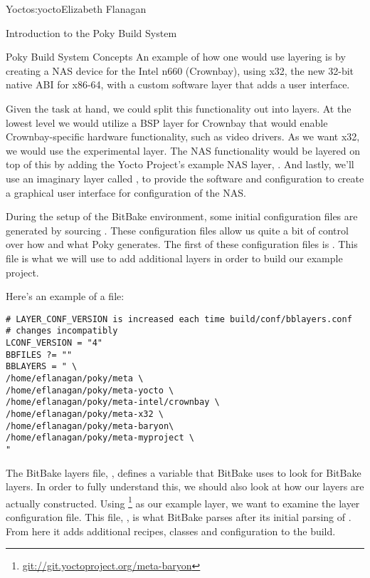 \begin{aosachapter}{Yocto}{s:yocto}{Elizabeth Flanagan}
\begin{aosasect1}{Introduction to the Poky Build System}
\begin{aosasect2}{Poky Build System Concepts}
An example of how one would use layering is by creating a NAS device
for the Intel n660 (Crownbay), using x32, the new 32-bit native
ABI for x86-64, with a custom software layer that adds a user
interface.

Given the task at hand, we could split this functionality out into
layers. At the lowest level we would utilize a BSP layer for Crownbay
that would enable Crownbay-specific hardware functionality, such as
video drivers. As we want x32, we would use the experimental 
layer. The NAS functionality would be layered on top of this by adding
the Yocto Project's example NAS layer, . And lastly, we'll
use an imaginary layer called , to provide the software
and configuration to create a graphical user interface for
configuration of the NAS.

During the setup of the BitBake environment, some initial configuration files are generated by sourcing .
These configuration files allow us quite a bit of control over how and
what Poky generates. The first of these configuration files is
. This file is what we will use to add additional layers
in order to build our example project. 

\pagebreak

\noindent Here's an example of a  file:

\begin{verbatim}
# LAYER_CONF_VERSION is increased each time build/conf/bblayers.conf
# changes incompatibly
LCONF_VERSION = "4"
BBFILES ?= ""
BBLAYERS = " \
/home/eflanagan/poky/meta \
/home/eflanagan/poky/meta-yocto \
/home/eflanagan/poky/meta-intel/crownbay \
/home/eflanagan/poky/meta-x32 \
/home/eflanagan/poky/meta-baryon\
/home/eflanagan/poky/meta-myproject \
"
\end{verbatim}

The BitBake layers file, \code{bblayers}, defines a variable  that
BitBake uses to look for BitBake layers. In order to fully understand
this, we should also look at how our layers are actually
constructed. Using
 \footnote{\url{git://git.yoctoproject.org/meta-baryon}} as
our example layer, we want to examine the layer configuration
file. This file, , is what BitBake parses after its
initial parsing of \code{bblayers.conf}. From here it adds additional
recipes, classes and configuration to the build.



\end{aosasect2}
\end{aosasect1}
\end{aosachapter}

